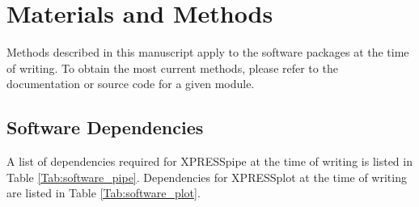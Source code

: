 \documentclass[10pt, oneside]{article}
\begin{document}
\section{Materials and Methods}
Methods described in this manuscript apply to the software packages at the time of writing. To obtain the most current methods, please refer to the documentation or source code for a given module.

\subsection{Software Dependencies}
A list of dependencies required for XPRESSpipe at the time of writing is listed in Table \ref{Tab:software_pipe}. Dependencies for XPRESSplot at the time of writing are listed in Table \ref{Tab:software_plot}.
\end{document}

